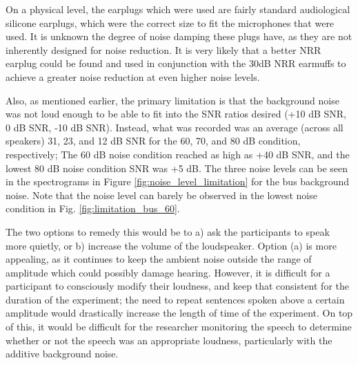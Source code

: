 \documentclass[dissertation,copyright]{uathesis}
\begin{document}
On a physical level, the earplugs which were used are fairly standard audiological silicone earplugs, which were the correct size to fit the microphones that were used.  It is unknown the degree of noise damping these plugs have, as they are not inherently designed for noise reduction.  It is very likely that a better NRR earplug could be found and used in conjunction with the 30dB NRR earmuffs to achieve a greater noise reduction at even higher noise levels.

Also, as mentioned earlier, the primary limitation is that the background noise was not loud enough to be able to fit into the SNR ratios desired (+10 dB SNR, 0 dB SNR, -10 dB SNR).  Instead, what was recorded was an average (across all speakers) 31, 23, and 12 dB SNR for the 60, 70, and 80 dB condition, respectively; The 60 dB noise condition reached as high as +40 dB SNR, and the lowest 80 dB noise condition SNR was +5 dB. The three noise levels can be seen in the spectrograms in Figure \ref{fig:noise_level_limitation} for the bus background noise.  Note that the noise level can barely be observed in the lowest noise condition in Fig. \ref{fig:limitation_bus_60}.

The two options to remedy this would be to a) ask the participants to speak more quietly, or b) increase the volume of the loudspeaker.  Option (a) is more appealing, as it continues to keep the ambient noise outside the range of amplitude which could possibly damage hearing.  However, it is difficult for a participant to consciously modify their loudness, and keep that consistent for the duration of the experiment; the need to repeat sentences spoken above a certain amplitude would drastically increase the length of time of the experiment.  On top of this, it would be difficult for the researcher monitoring the speech to determine whether or not the speech was an appropriate loudness, particularly with the additive background noise.  
\end{document}
